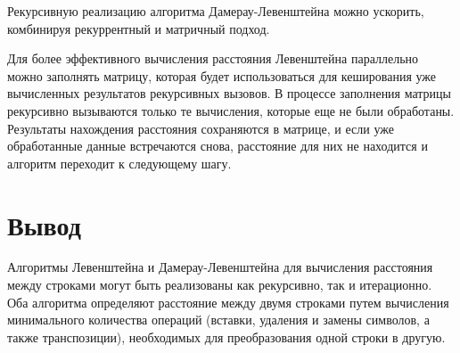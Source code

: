 Рекурсивную реализацию алгоритма Дамерау-Левенштейна можно ускорить, комбинируя рекуррентный и матричный подход.

Для более эффективного вычисления расстояния Левенштейна параллельно можно заполнять матрицу, которая будет использоваться для кеширования уже вычисленных результатов рекурсивных вызовов. В процессе заполнения матрицы рекурсивно вызываются только те вычисления, которые еще не были обработаны. Результаты нахождения расстояния сохраняются в матрице, и если уже обработанные данные встречаются снова, расстояние для них не находится и алгоритм переходит к следующему шагу.

\section*{Вывод}

Алгоритмы Левенштейна и Дамерау-Левенштейна для вычисления расстояния между строками могут быть реализованы как рекурсивно, так и итерационно. Оба алгоритма определяют расстояние между двумя строками путем вычисления минимального количества операций (вставки, удаления и замены символов, а также транспозиции), необходимых для преобразования одной строки в другую.

\pagebreak

